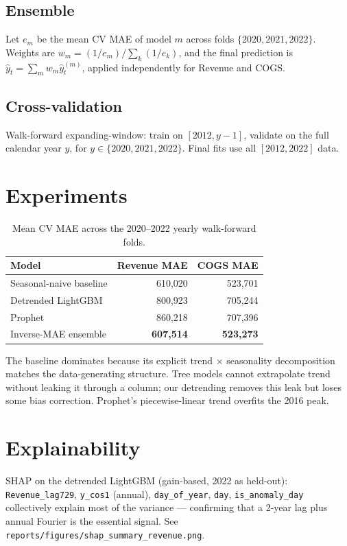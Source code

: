 \documentclass{article}
\begin{document}
\subsection{Ensemble}
Let $e_m$ be the mean CV MAE of model $m$ across folds
$\{2020, 2021, 2022\}$. Weights are
$w_m = (1/e_m) / \sum_k (1/e_k)$, and the final prediction is
$\hat y_t = \sum_m w_m \hat y_t^{(m)}$, applied independently for Revenue and
COGS.

\subsection{Cross-validation}
Walk-forward expanding-window: train on $[2012, y-1]$, validate on the full
calendar year $y$, for $y \in \{2020, 2021, 2022\}$. Final fits use all
$[2012, 2022]$ data.

\section{Experiments}

\begin{table}[h]
  \centering
  \caption{Mean CV MAE across the 2020--2022 yearly walk-forward folds.}
  \begin{tabular}{lrr}
    \toprule
    Model & Revenue MAE & COGS MAE \\
    \midrule
    Seasonal-naive baseline & 610{,}020 & 523{,}701 \\
    Detrended LightGBM      & 800{,}923 & 705{,}244 \\
    Prophet                 & 860{,}218 & 707{,}396 \\
    \midrule
    Inverse-MAE ensemble    & \textbf{607{,}514} & \textbf{523{,}273} \\
    \bottomrule
  \end{tabular}
\end{table}

The baseline dominates because its explicit trend $\times$ seasonality
decomposition matches the data-generating structure. Tree models cannot
extrapolate trend without leaking it through a column; our detrending removes
this leak but loses some bias correction. Prophet's piecewise-linear trend
overfits the 2016 peak.

\section{Explainability}

SHAP on the detrended LightGBM (gain-based, 2022 as held-out):
\texttt{Revenue\_lag729}, \texttt{y\_cos1} (annual), \texttt{day\_of\_year},
\texttt{day}, \texttt{is\_anomaly\_day} collectively explain most of the
variance --- confirming that a 2-year lag plus annual Fourier is the essential
signal. See \texttt{reports/figures/shap\_summary\_revenue.png}.
\end{document}
